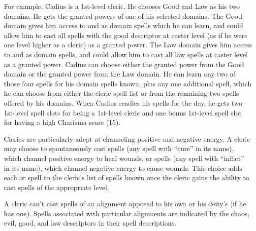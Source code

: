 \par For example, Cadius is a 1st-level cleric. He chooses Good
and Law as his two domains. He gets the granted powers of one of his selected domains.
The Good domain gives him access to  and  as domain spells which he can learn, and could allow him to cast all spells with the good descriptor at  caster level (as if he were one level higher as a cleric) as a granted power. The Law domain gives him access to  and  as domain spells, and could allow him to cast all law spells at  caster level as a granted power. Cadius can choose either the granted power from the Good domain or the granted power from the Law domain. He can learn any two of those four spells for his domain spells known, plus any one additional spell, which he can choose from either the cleric spell list or from the remaining two spells offered by his domains. When Cadius readies his spells for the day, he gets two 1st-level spell slots for being a 1st-level cleric and one bonus 1st-level spell slot for having a high Charisma score (15).

 Clerics are particularly adept at channeling positive and negative energy. A cleric may choose to spontaneously cast  spells (any spell with ``cure'' in its name), which channel positive energy to heal wounds, or  spells (any spell with ``inflict'' in its name), which channel negative energy to cause wounds. This choice adds each  or  spell to the cleric's list of spells known once the cleric gains the ability to cast spells of the appropriate level.

 A cleric can't cast spells of an alignment opposed to his own or his deity's (if he has one). Spells associated with particular alignments are indicated by the chaos, evil, good, and law descriptors in their spell descriptions.

